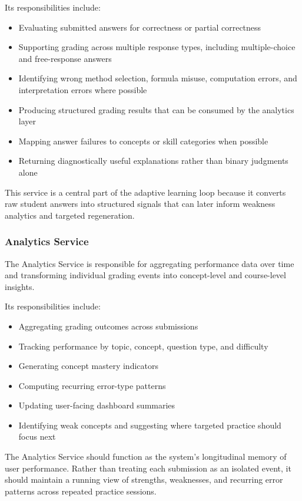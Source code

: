 \documentclass[11pt]{article}
\begin{document}
Its responsibilities include:
\begin{itemize}
\item Evaluating submitted answers for correctness or partial correctness
\item Supporting grading across multiple response types, including multiple-choice and free-response answers
\item Identifying wrong method selection, formula misuse, computation errors, and interpretation errors where possible
\item Producing structured grading results that can be consumed by the analytics layer
\item Mapping answer failures to concepts or skill categories when possible
\item Returning diagnostically useful explanations rather than binary judgments alone
\end{itemize}

This service is a central part of the adaptive learning loop because it converts raw student answers into structured signals that can later inform weakness analytics and targeted regeneration.

\subsubsection{Analytics Service}
The Analytics Service is responsible for aggregating performance data over time and transforming individual grading events into concept-level and course-level insights.

Its responsibilities include:
\begin{itemize}
\item Aggregating grading outcomes across submissions
\item Tracking performance by topic, concept, question type, and difficulty
\item Generating concept mastery indicators
\item Computing recurring error-type patterns
\item Updating user-facing dashboard summaries
\item Identifying weak concepts and suggesting where targeted practice should focus next
\end{itemize}

The Analytics Service should function as the system's longitudinal memory of user performance. Rather than treating each submission as an isolated event, it should maintain a running view of strengths, weaknesses, and recurring error patterns across repeated practice sessions.
\end{document}
